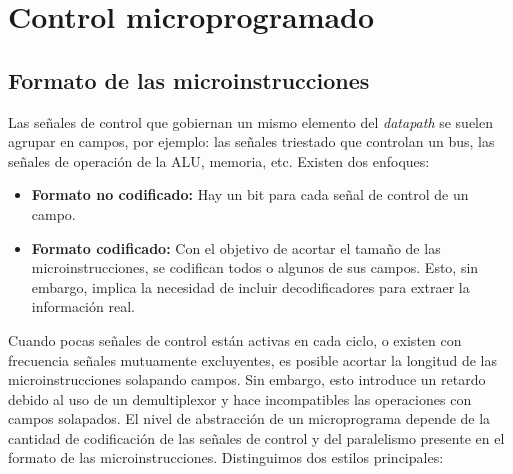 \section{Control microprogramado}

\subsection{Formato de las microinstrucciones}

Las señales de control que gobiernan un mismo elemento del \textit{datapath} se suelen agrupar en campos, por ejemplo: las señales triestado que controlan un bus, las señales de operación de la ALU, memoria, etc. Existen dos enfoques:

\begin{itemize}
    \item \textbf{Formato no codificado:} Hay un bit para cada señal de control de un campo.
        \begin{center}
            
        \end{center}
    \item \textbf{Formato codificado:} Con el objetivo de acortar el tamaño de las microinstrucciones, se codifican todos o algunos de sus campos. Esto, sin embargo, implica la necesidad de incluir decodificadores para extraer la información real.
        \begin{center}
            
        \end{center}
\end{itemize}

Cuando pocas señales de control están activas en cada ciclo, o existen con frecuencia señales mutuamente excluyentes, es posible acortar la longitud de las microinstrucciones solapando campos. Sin embargo, esto introduce un retardo debido al uso de un demultiplexor y hace incompatibles las operaciones con campos solapados.
El nivel de abstracción de un microprograma depende de la cantidad de codificación de las señales de control y del paralelismo presente en el formato de las microinstrucciones. Distinguimos dos estilos principales:

